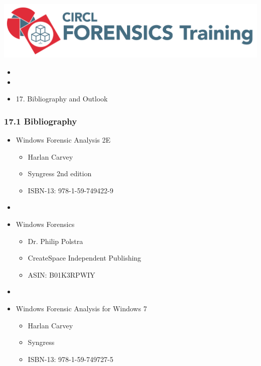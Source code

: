 

\begin{frame}
    \includegraphics[scale=0.3]{images/logo-circl-Forensics.png}
    \begin{itemize}
        \item[]
        \item[]
        \item[] 17. Bibliography and Outlook
    \end{itemize}
\end{frame}


\begin{frame}
  \frametitle{17.1 Bibliography}
  \begin{itemize}
      \item Windows Forensic Analysis 2E
        \begin{itemize}
            \item[] Harlan Carvey
            \item[] Syngress 2nd edition
            \item[] ISBN-13: 978-1-59-749422-9
        \end{itemize}
      \item[]
      \item Windows Forensics
        \begin{itemize}
            \item[] Dr. Philip Polstra
            \item[] CreateSpace Independent Publishing
            \item[] ASIN: B01K3RPWIY
        \end{itemize}
      \item[]
      \item Windows Forensic Analysis for Windows 7
        \begin{itemize}
            \item[] Harlan Carvey
            \item[] Syngress
            \item[] ISBN-13: 978-1-59-749727-5
        \end{itemize}
  \end{itemize}
\end{frame}


